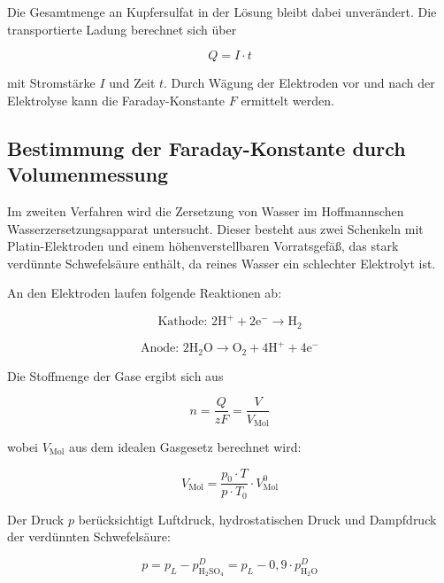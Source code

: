 Die Gesamtmenge an Kupfersulfat in der Lösung bleibt dabei unverändert. Die transportierte Ladung berechnet sich über

\begin{equation}
Q = I \cdot t
\label{eq:ladung}
\end{equation}

mit Stromstärke $I$ und Zeit $t$. Durch Wägung der Elektroden vor und nach der Elektrolyse kann die Faraday-Konstante $F$ ermittelt werden.

\subsection{Bestimmung der Faraday-Konstante durch Volumenmessung}
\label{sc:faraday_vol}

Im zweiten Verfahren wird die Zersetzung von Wasser im Hoffmannschen Wasserzersetzungsapparat untersucht. Dieser besteht aus zwei Schenkeln mit Platin-Elektroden und einem höhenverstellbaren Vorratsgefäß, das stark verdünnte Schwefelsäure enthält, da reines Wasser ein schlechter Elektrolyt ist.  

An den Elektroden laufen folgende Reaktionen ab:

\begin{equation}
\text{Kathode: } 2 \mathrm{H^+ + 2 e^- \rightarrow H_2}
\label{eq:h2_kathode}
\end{equation}

\begin{equation}
\text{Anode: } 2 \mathrm{H_2O \rightarrow O_2 + 4 H^+ + 4 e^-}
\label{eq:o2_anode}
\end{equation}

Die Stoffmenge der Gase ergibt sich aus

\begin{equation}
n = \frac{Q}{zF} = \frac{V}{V_\mathrm{Mol}}
\label{eq:stoffmenge}
\end{equation}

wobei $V_\mathrm{Mol}$ aus dem idealen Gasgesetz berechnet wird:

\begin{equation}
V_\mathrm{Mol} = \frac{p_0 \cdot T}{p \cdot T_0} \cdot V_\mathrm{Mol}^0
\label{eq:molvolumen}
\end{equation}

Der Druck $p$ berücksichtigt Luftdruck, hydrostatischen Druck und Dampfdruck der verdünnten Schwefelsäure:

\begin{equation}
p = p_L - p_\mathrm{H_2SO_4}^D = p_L - 0,9 \cdot p_\mathrm{H_2O}^D
\label{eq:druck}
\end{equation}

